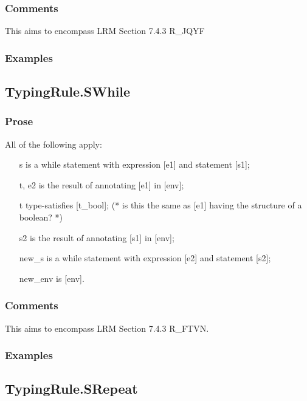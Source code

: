 \documentclass{book}
\begin{document}
    \subsubsection{Comments}
    This aims to encompass LRM Section 7.4.3 R\_JQYF

    \subsubsection{Examples}

\subsection{TypingRule.SWhile}

    \subsubsection{Prose}
    All of the following apply:
   \begin{itemize}
   \item [s] is a while statement with expression [e1] and statement [s1];
   \item [t, e2] is the result of annotating [e1] in [env];
   \item [t] type-satisfies [t\_bool]; (* is this the same as [e1] having the structure of a boolean? *)
   \item [s2] is the result of annotating [s1] in [env];
   \item [new\_s] is a while statement with expression [e2] and statement [s2];
   \item [new\_env] is [env].
   \end{itemize}

    \subsubsection{Comments}
    This aims to encompass LRM Section 7.4.3 R\_FTVN.

    \subsubsection{Examples}

\subsection{TypingRule.SRepeat}
\end{document}
